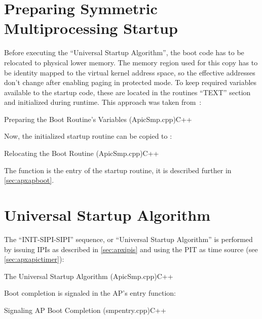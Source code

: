 \section{Preparing Symmetric Multiprocessing Startup}
\label{sec:apxpreparesmp}

Before executing the ``Universal Startup Algorithm'', the boot code has to be relocated to physical
lower memory. The memory region used for this copy has to be identity mapped to the virtual kernel
address space, so the effective addresses don't change after enabling paging in protected mode. To
keep required variables available to the startup code, these are located in the routines ``TEXT''
section and initialized during runtime. This approach was taken from~\cite[APIC.cpp]{serenity}:

\begin{codeblock}{Preparing the Boot Routine's Variables (ApicSmp.cpp)}{C++}
\end{codeblock}

Now, the initialized startup routine can be copied to :

\begin{codeblock}{Relocating the Boot Routine (ApicSmp.cpp)}{C++}
\end{codeblock}

The  function is the entry of the startup routine, it is described
further in \autoref{sec:apxapboot}.


\section{Universal Startup Algorithm}
\label{sec:apxmpusa}

The ``INIT-SIPI-SIPI'' sequence, or ``Universal Startup Algorithm'' is performed by issuing IPIs as
described in \autoref{sec:apxipis} and using the PIT as time source (see
\autoref{sec:apxapictimer}):

\begin{codeblock}{The Universal Startup Algorithm (ApicSmp.cpp)}{C++}
\end{codeblock}

Boot completion is signaled in the AP's entry function:

\begin{codeblock}{Signaling AP Boot Completion (smp\textunderscore{}entry.cpp)}{C++}
\end{codeblock}

